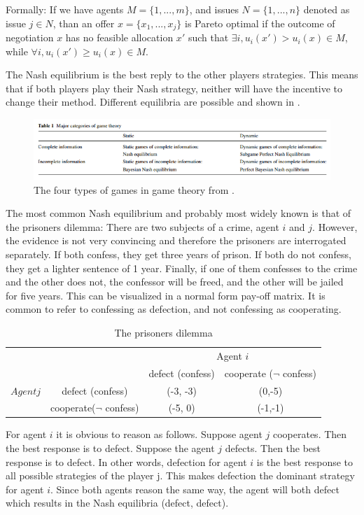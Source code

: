 Formally: If we have agents $M = \{1,...,m\}$, and issues $N = \{1,...,n\}$ denoted as issue $j\in N$, than an offer $x = \{x_1, ..., x_j\}$ is Pareto optimal if the outcome of negotiation $x$ has no feasible allocation $x'$ such that $ \exists i, u_i(x')> u_i(x) \in M$, while $\forall i, u_i(x')\geq u_i(x)  \in M$. 

The Nash equilibrium is the best reply to the other players strategies. This means that if both players play their Nash strategy, neither will have the incentive to change their method. Different equilibria are possible and shown in . 

\begin{figure}[h]
	\centering
	\includegraphics[width=0.9\linewidth]{img/major_categories_of_game_theory}
	\caption{The four types of games in game theory from \citet{trappey2013multi}.}
	\label{fig:majorcategoriesofgametheory}
\end{figure}
The most common Nash equilibrium and probably most widely known is that of the prisoners dilemma:
There are two subjects of a crime, agent $i$ and $j$. However, the evidence is not very convincing and therefore the prisoners are interrogated separately. If both confess, they get three years of prison. If both do not confess, they get a lighter sentence of 1 year. Finally, if one of them confesses to the crime and the other does not, the confessor will be freed, and the other will be jailed for five years.
This can be visualized in a normal form pay-off matrix. It is common to refer to confessing as defection, and not confessing as cooperating.
\begin{table}[h]

\begin{tabular}{|c|c|c|c|}
	\hline 
		&  				& \multicolumn{2}{c}{Agent $i$}\\ 
	 	&				& defect (confess) 	& cooperate ($\neg$ confess) \\ 
	$Agent j$	& defect (confess)	&  	(-3, -3)			& (0,-5) \\ 
		& cooperate($\neg $ confess) 	&  (-5, 0)				& (-1,-1) \\ 
	\hline 
\end{tabular} \label{tab:nashprison} \caption{The prisoners dilemma}
\end{table}
For agent $i$ it is obvious to reason as follows. Suppose agent $j$ cooperates. Then the best response is to defect. Suppose the agent $j$ defects. Then the best response is to defect. In other words, defection for agent $i$ is the best response to all possible strategies of the player j. This makes defection the dominant strategy for agent $i$. Since both agents reason the same way, the agent will both defect which results in the Nash equilibria (defect, defect).


